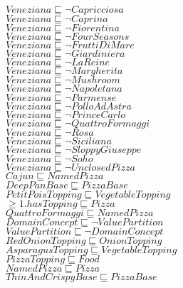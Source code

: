 \documentclass[a4paper,10pt]{article}
\begin{document}
 $Veneziana \sqsubseteq  \lnot Capricciosa$\\ 
 $Veneziana \sqsubseteq  \lnot Caprina$\\ 
 $Veneziana \sqsubseteq  \lnot Fiorentina$\\ 
 $Veneziana \sqsubseteq  \lnot FourSeasons$\\ 
 $Veneziana \sqsubseteq  \lnot FruttiDiMare$\\ 
 $Veneziana \sqsubseteq  \lnot Giardiniera$\\ 
 $Veneziana \sqsubseteq  \lnot LaReine$\\ 
 $Veneziana \sqsubseteq  \lnot Margherita$\\ 
 $Veneziana \sqsubseteq  \lnot Mushroom$\\ 
 $Veneziana \sqsubseteq  \lnot Napoletana$\\ 
 $Veneziana \sqsubseteq  \lnot Parmense$\\ 
 $Veneziana \sqsubseteq  \lnot PolloAdAstra$\\ 
 $Veneziana \sqsubseteq  \lnot PrinceCarlo$\\ 
 $Veneziana \sqsubseteq  \lnot QuattroFormaggi$\\ 
 $Veneziana \sqsubseteq  \lnot Rosa$\\ 
 $Veneziana \sqsubseteq  \lnot Siciliana$\\ 
 $Veneziana \sqsubseteq  \lnot SloppyGiuseppe$\\ 
 $Veneziana \sqsubseteq  \lnot Soho$\\ 
 $Veneziana \sqsubseteq  \lnot UnclosedPizza$\\ 
 $Cajun \sqsubseteq NamedPizza$\\ 
 $DeepPanBase \sqsubseteq PizzaBase$\\ 
 $PetitPoisTopping \sqsubseteq VegetableTopping$\\ 
 $ \ge 1.hasTopping \sqsubseteq Pizza$\\ 
 $QuattroFormaggi \sqsubseteq NamedPizza$\\ 
 $DomainConcept \sqsubseteq  \lnot ValuePartition$\\ 
 $ValuePartition \sqsubseteq  \lnot DomainConcept$\\ 
 $RedOnionTopping \sqsubseteq OnionTopping$\\ 
 $AsparagusTopping \sqsubseteq VegetableTopping$\\ 
 $PizzaTopping \sqsubseteq Food$\\ 
 $NamedPizza \sqsubseteq Pizza$\\ 
 $ThinAndCrispyBase \sqsubseteq PizzaBase$\\ 
\end{document}
